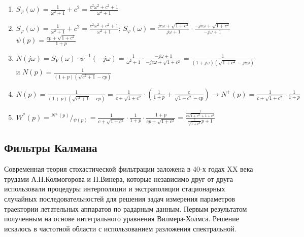 \documentclass[preprint,russian,a5paper,10pt,twoside,mediummath]{ncc}
\begin{document}
\begin{enumerate}
\item ${{S}_{\varphi }}\left( \omega  \right)=\frac{1}{{{\omega }^{2}}+1}+{{c}^{2}}=\frac{{{c}^{2}}{{\omega }^{2}}+{{c}^{2}}+1}{{{\omega }^{2}}+1}$
\item ${{S}_{\varphi }}\left( \omega  \right)=\frac{1}{{{\omega }^{2}}+1}+{{c}^{2}}=\frac{{{c}^{2}}{{\omega }^{2}}+{{c}^{2}}+1}{{{\omega }^{2}}+1}$;
${{S}_{\varphi }}\left( \omega  \right)=\frac{jc\omega +\sqrt{1+{{c}^{2}}}}{j\omega +1}\cdot \frac{-jc\omega +\sqrt{1+{{c}^{2}}}}{-j\omega +1}$ $\psi \left( p \right)=\frac{cp+\sqrt{1+{{c}^{2}}}}{1+p}$
\item $N\left( j\omega  \right)={{S}_{V}}\left( \omega  \right)\cdot {{\psi }^{-1}}\left( -j\omega  \right)=\frac{1}{{{\omega }^{2}}+1}\cdot \frac{-j\omega +1}{-jc\omega +\sqrt{1+{{c}^{2}}}}=\frac{1}{\left( 1+j\omega  \right)\left( \sqrt{1+{{c}^{2}}}-jc\omega  \right)}$ и $N\left( p \right)=\frac{1}{\left( 1+p \right)\left( \sqrt{{{c}^{2}}+1}-cp \right)}$
\item $N\left( p \right)=\frac{1}{\left( 1+p \right)\left( \sqrt{{{c}^{2}}+1}-cp \right)}=\frac{1}{c+\sqrt{1+{{c}^{2}}}}\cdot \left( \frac{1}{1+p}+\frac{c}{\sqrt{1+{{c}^{2}}}-cp} \right)\to {{N}^{+}}\left( p \right)=\frac{1}{c+\sqrt{1+{{c}^{2}}}}\cdot \frac{1}{1+p}$
\item ${{W}^{*}}\left( p \right)={}^{{{N}^{+}}\left( p \right)}/{}_{\psi \left( p \right)}=\frac{1}{c+\sqrt{1+{{c}^{2}}}}\cdot \frac{1}{1+p}\cdot \frac{1+p}{cp+\sqrt{1+{{c}^{2}}}}=\frac{\frac{1}{c\sqrt{1+{{c}^{2}}}+1+{{c}^{2}}}}{\frac{c}{\sqrt{1+{{c}^{2}}}}p+1}$
\end{enumerate}

	\subsection{Фильтры Калмана\label{stochastic:filters}}
\par Современная теория стохастической фильтрации заложена в 40-х годах XX века трудами А.Н.Колмогорова и Н.Винера, которые независимо друг от друга использовали процедуры интерполяции и экстраполяции стационарных случайных последовательностей для решения задач   измерения параметров траектории летательных аппаратов по радарным данным. Первым результатом полученным на основе интегрального уравнения Вилмера-Холмса. Решение искалось в частотной области с использованием разложения спектральной.
\end{document}
